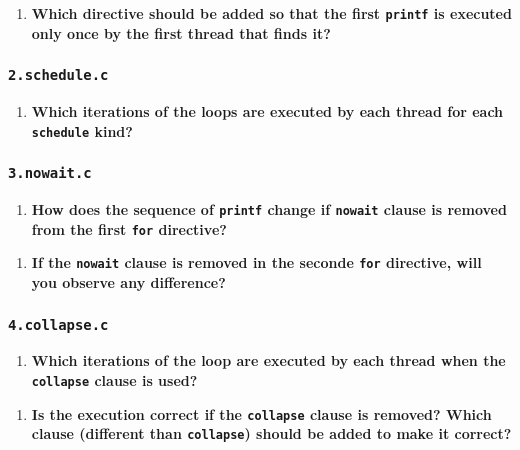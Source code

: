 \documentclass[a4paper]{article}
\begin{document}
\begin{enumerate}[resume]
	\item \textbf{Which directive should be added so that the first \texttt{printf} is executed only once by the first thread that finds it?}
\end{enumerate}

\subsubsection{\texttt{2.schedule.c}}

\begin{enumerate}
	\item \textbf{Which iterations of the loops are executed by each thread for each \texttt{schedule} kind?}
\end{enumerate}

\subsubsection{\texttt{3.nowait.c}}

\begin{enumerate}
	\item \textbf{How does the sequence of \texttt{printf} change if \texttt{nowait} clause is removed from the first \texttt{for} directive?}
\end{enumerate}

\begin{enumerate}[resume]
	\item \textbf{If the \texttt{nowait} clause is removed in the seconde \texttt{for} directive, will you observe any difference?}
\end{enumerate}

\subsubsection{\texttt{4.collapse.c}}
\begin{enumerate}
	\item \textbf{Which iterations of the loop are executed by each thread when the \texttt{collapse} clause is used?}
\end{enumerate}

\begin{enumerate}[resume]
	\item \textbf{Is the execution correct if the \texttt{collapse} clause is removed? Which clause (different than \texttt{collapse}) should be added to make it correct?}
\end{enumerate}
\end{document}
